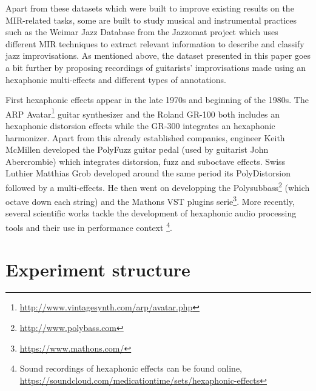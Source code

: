 \documentclass{article}
\begin{document}
Apart from these datasets which were built to improve existing results on the MIR-related tasks, some are built to study musical and instrumental practices such as the Weimar Jazz Database \cite{Pfleiderer:2017:BOOK} from the Jazzomat project \cite{Frieler:2013:Jazzomat} which uses different MIR techniques to extract relevant information to describe and classify jazz improvisations. As mentioned above, the dataset presented in this paper goes a bit further by proposing recordings of guitarists' improvisations made using an hexaphonic multi-effects and different types of annotations.

First hexaphonic effects appear in the late 1970s and beginning of the 1980s. The ARP Avatar\footnote{\url{http://www.vintagesynth.com/arp/avatar.php}} guitar synthesizer and the Roland GR-100\cite{joness-gr100} both includes an hexaphonic distorsion effects while the GR-300\cite{joness-gr300} integrates an hexaphonic harmonizer. Apart from this already established companies, engineer Keith McMillen developed the PolyFuzz\cite{McMillen2015-timeline} guitar pedal (used by guitarist John Abercrombie) which integrates distorsion, fuzz and suboctave effects. Swiss Luthier Matthias Grob developed around the same period its PolyDistorsion \cite{grob:paradisGuitar} followed by a multi-effects. He then went on developping the Polysubbass\footnote{\url{http://www.polybass.com}} (which octave down each string) and the Mathons VST plugins serie\footnote{\url{https://www.mathons.com/}}.
More recently, several scientific works tackle the development of hexaphonic audio processing tools \cite{sci:Puckette2007, sci:Reboursiere2010} and their use in performance context \cite{Reboursiere2020_Puzzle_eng,sci:Graham2012, Bates2009}\footnote{Sound recordings of hexaphonic effects can be found online, \href{https://soundcloud.com/medicationtime/sets/hexaphonic-effects}{https://soundcloud.com/medicationtime/sets/hexaphonic-effects}}.


\section{Experiment structure}\label{sec:exp_structure}
\end{document}
